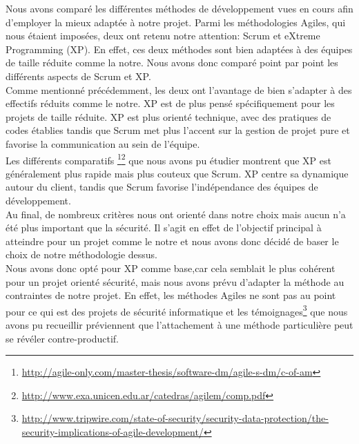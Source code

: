 \documentclass{../../res/univ-projet}
\begin{document}
	Nous avons comparé les différentes méthodes de développement vues en cours afin d'employer la mieux adaptée à notre projet. Parmi les méthodologies Agiles, qui nous étaient imposées, deux ont retenu notre attention: Scrum et eXtreme Programming (XP). En effet, ces deux méthodes sont bien adaptées à des équipes de taille réduite comme la notre. Nous avons donc comparé point par point les différents aspects de Scrum et XP.	
\\

		Comme mentionné précédemment, les deux ont l'avantage de bien s'adapter à des effectifs réduits comme le notre. XP est de plus pensé spécifiquement pour les projets de taille réduite. XP est plus orienté technique, avec des pratiques de codes établies tandis que Scrum met plus l'accent sur la gestion de projet pure et favorise la communication au sein de l'équipe.\\
		
		
		Les différents comparatifs \footnote{\href{http://agile-only.com/master-thesis/software-dm/agile-s-dm/c-of-am}{http://agile-only.com/master-thesis/software-dm/agile-s-dm/c-of-am}}\footnote{\href{http://www.exa.unicen.edu.ar/catedras/agilem/comp.pdf}{http://www.exa.unicen.edu.ar/catedras/agilem/comp.pdf}} que nous avons pu étudier montrent que XP est généralement plus rapide mais plus couteux que Scrum. XP centre sa dynamique autour du client, tandis que Scrum favorise l'indépendance des équipes de développement.\\
		
	
	Au final, de nombreux critères nous ont orienté dans notre choix mais aucun n'a été plus important que la sécurité. Il s'agit en effet de l'objectif principal à atteindre pour un projet comme le notre et nous avons donc décidé de baser le choix de notre méthodologie dessus.
\\
		
	Nous avons donc opté pour XP comme base,car cela semblait le plus cohérent pour un projet orienté sécurité, mais nous avons prévu d'adapter la méthode au contraintes de notre projet. En effet, les méthodes Agiles ne sont pas au point pour ce qui est des projets de sécurité informatique et les témoignages\footnote{\href{http://www.tripwire.com/state-of-security/security-data-protection/the-security-implications-of-agile-development/}{http://www.tripwire.com/state-of-security/security-data-protection/the-security-implications-of-agile-development/}} que nous avons pu recueillir préviennent que l'attachement à une méthode particulière peut se révéler contre-productif. 
\\
\end{document}
